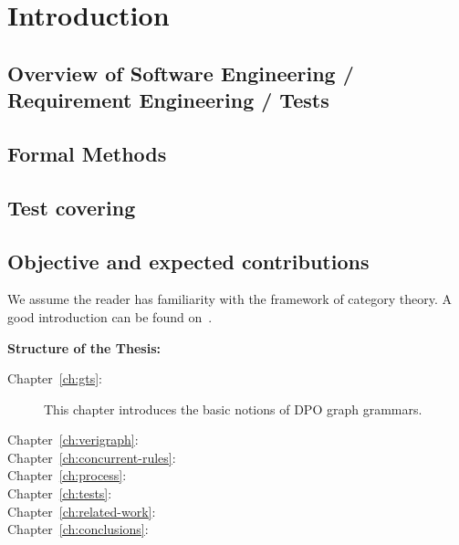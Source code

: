 \chapter{Introduction}

\section{Overview of Software Engineering / Requirement Engineering / Tests}

\section{Formal Methods}

\section{Test covering}

\section{Objective and expected contributions}

We assume the reader has familiarity with the framework of category theory. A good introduction can be found on~\cite{Pierce1991}.

\hfill \break
\textbf{Structure of the Thesis:}

\begin{description}
  \item[Chapter~\ref{ch:gts}:] This chapter introduces the basic notions of DPO graph grammars.
  \item[Chapter~\ref{ch:verigraph}:]
  \item[Chapter~\ref{ch:concurrent-rules}:]
  \item[Chapter~\ref{ch:process}:]
  \item[Chapter~\ref{ch:tests}:]
  \item[Chapter~\ref{ch:related-work}:]
  \item[Chapter~\ref{ch:conclusions}:]
\end{description}

